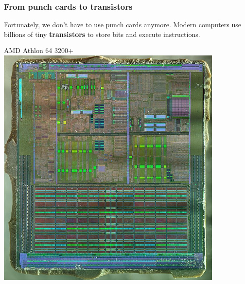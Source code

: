 \documentclass{beamer}
\begin{document}
\begin{frame}
  \frametitle{From punch cards to transistors}
  
  \begin{minipage}{0.45\textwidth}
    \vspace{-1cm}
    Fortunately, we don't have to use punch cards anymore. Modern computers use billions of tiny \textbf{transistors} to store bits and execute instructions.
    \end{minipage}
    \begin{minipage}{0.5\textwidth}
    \vspace{-1cm}
    \begin{center}
      \vspace{0.5cm}
      AMD Athlon 64 3200+\\
      \smallskip
    \includegraphics[width=0.85\textwidth]{fig/Athlon.jpg}
    \end{center}
    \end{minipage}
\end{frame}
\end{document}
